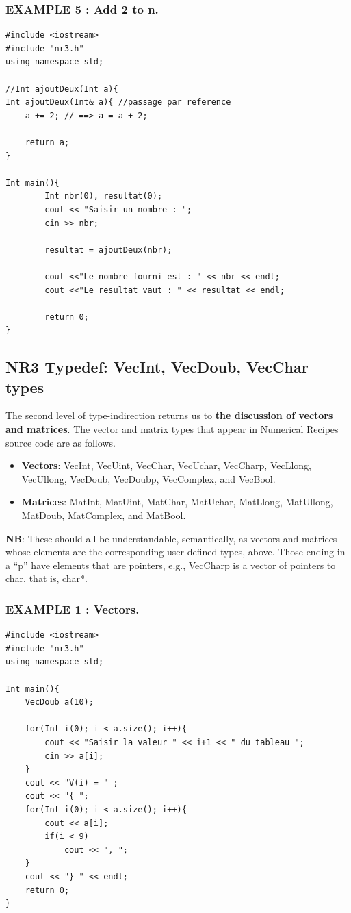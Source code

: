 \documentclass[12pt]{report}
\begin{document}
\subsubsection{EXAMPLE 5 : Add 2 to n.}

\begin{lstlisting}[style=CStyle]
#include <iostream>
#include "nr3.h"
using namespace std;

//Int ajoutDeux(Int a){
Int ajoutDeux(Int& a){ //passage par reference
	a += 2; // ==> a = a + 2;
		
	return a;
}

Int main(){
		Int nbr(0), resultat(0);
		cout << "Saisir un nombre : ";
		cin >> nbr;
		
		resultat = ajoutDeux(nbr);
		
		cout <<"Le nombre fourni est : " << nbr << endl;
		cout <<"Le resultat vaut : " << resultat << endl;
		
		return 0; 
}

\end{lstlisting}

\subsection{NR3 Typedef: VecInt, VecDoub, VecChar types}
The second level of type-indirection returns us to \textbf{the discussion of vectors and
matrices}. The vector and matrix types that appear in Numerical Recipes source
code are as follows. 
\begin{itemize}
    \item \textbf{Vectors}: VecInt, VecUint, VecChar, VecUchar, VecCharp,
VecLlong, VecUllong, VecDoub, VecDoubp, VecComplex, and VecBool.

    \item \textbf{Matrices}: MatInt, MatUint, MatChar, MatUchar, MatLlong, MatUllong, MatDoub,
MatComplex, and MatBool. 
\end{itemize}


\textbf{NB}: These should all be understandable, semantically, as
vectors and matrices whose elements are the corresponding user-defined types, above. Those ending in a “p” have elements that are pointers, e.g., VecCharp is a vector of
pointers to char, that is, char*.

\subsubsection{EXAMPLE 1 : Vectors.}

\begin{lstlisting}[style=CStyle]
#include <iostream>
#include "nr3.h"
using namespace std;

Int main(){
	VecDoub a(10);
	
	for(Int i(0); i < a.size(); i++){
		cout << "Saisir la valeur " << i+1 << " du tableau ";
		cin >> a[i];
	}
	cout << "V(i) = " ;
	cout << "{ ";
	for(Int i(0); i < a.size(); i++){
		cout << a[i];
		if(i < 9) 
			cout << ", ";
	} 
	cout << "} " << endl;
	return 0;
}

\end{lstlisting}
\end{document}
